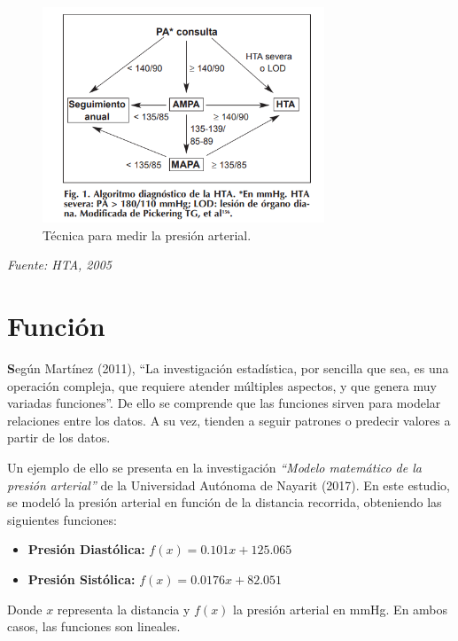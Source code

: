 \documentclass[a4paper,10pt]{article}
\begin{document}
\vspace{1em}
\begin{figure}[H]
    \centering
    \includegraphics[width=0.75\textwidth]{presion_metodo.png}
    \caption{Técnica para medir la presión arterial.}
    \label{fig:presion}
\end{figure}
\textit{Fuente: HTA, 2005}

\vspace{2em}

\section*{Función}
\textbf Según Martínez (2011), ``La investigación estadística, por sencilla que sea, es una operación compleja, que requiere atender múltiples aspectos, y que genera muy variadas funciones''. De ello se comprende que las funciones sirven para modelar relaciones entre los datos. A su vez, tienden a seguir patrones o predecir valores a partir de los datos.

Un ejemplo de ello se presenta en la investigación \textit{“Modelo matemático de la presión arterial”} de la Universidad Autónoma de Nayarit (2017). En este estudio, se modeló la presión arterial en función de la distancia recorrida, obteniendo las siguientes funciones:

\begin{itemize}
    \item \textbf{Presión Diastólica:} $f(x) = 0.101x + 125.065$
    \item \textbf{Presión Sistólica:} $f(x) = 0.0176x + 82.051$
\end{itemize}

Donde $x$ representa la distancia y $f(x)$ la presión arterial en mmHg. En ambos casos, las funciones son lineales.
\vspace{2em}
\end{document}
